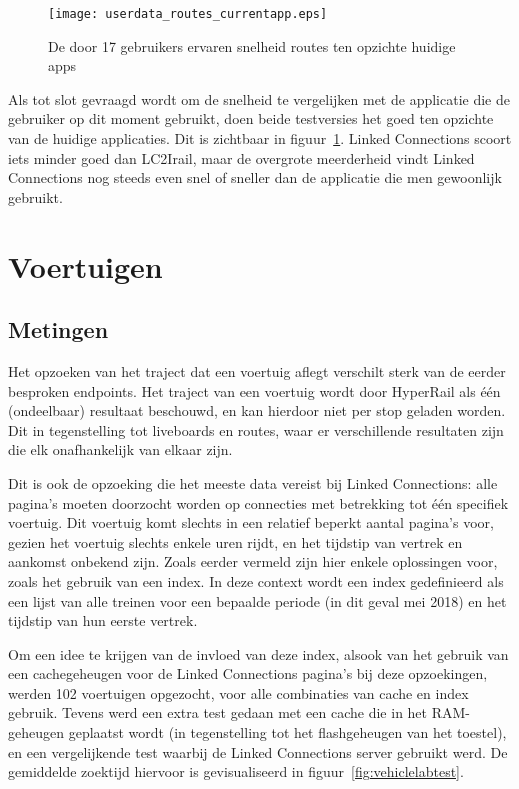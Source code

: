 \begin{figure}[ht]
	\centering
	\texttt{[image: userdata\_routes\_currentapp.eps]}
	\caption[Door gebruikers ervaren snelheid routes tov huidige apps]{De door 17 gebruikers ervaren snelheid routes ten opzichte huidige apps }
	\label{fig:relativePerceptionRoutes}
\end{figure}

Als tot slot gevraagd wordt om de snelheid te vergelijken met de applicatie die de gebruiker op dit moment gebruikt, doen beide testversies het goed ten opzichte van de huidige applicaties. Dit is zichtbaar in figuur~\ref{fig:relativePerceptionRoutes}. Linked Connections scoort iets minder goed dan LC2Irail, maar de overgrote meerderheid vindt Linked Connections nog steeds even snel of sneller dan de applicatie die men gewoonlijk gebruikt.


\section{Voertuigen}

\subsection{Metingen}
Het opzoeken van het traject dat een voertuig aflegt verschilt sterk van de eerder besproken endpoints. Het traject van een voertuig wordt door HyperRail als één (ondeelbaar) resultaat beschouwd, en kan hierdoor niet per stop geladen worden. Dit in tegenstelling tot liveboards en routes, waar er verschillende resultaten zijn die elk onafhankelijk van elkaar zijn.

Dit is ook de opzoeking die het meeste data vereist bij Linked Connections: alle pagina's moeten doorzocht worden op connecties met betrekking tot één specifiek voertuig. Dit voertuig komt slechts in een relatief beperkt aantal pagina's voor, gezien het voertuig slechts enkele uren rijdt, en het tijdstip van vertrek en aankomst onbekend zijn. Zoals eerder vermeld %
zijn hier enkele oplossingen voor, zoals het gebruik van een index. In deze context wordt een index gedefinieerd als een lijst van alle treinen voor een bepaalde periode (in dit geval mei 2018) en het tijdstip van hun eerste vertrek.

Om een idee te krijgen van de invloed van deze index, alsook van het gebruik van een cachegeheugen voor de Linked Connections pagina's bij deze opzoekingen, werden 102 voertuigen opgezocht, voor alle combinaties van cache en index gebruik. Tevens werd een extra test gedaan met een cache die in het RAM-geheugen geplaatst wordt (in tegenstelling tot het flashgeheugen van het toestel), en een vergelijkende test waarbij de Linked Connections server gebruikt werd. De gemiddelde zoektijd hiervoor is gevisualiseerd in figuur~\ref{fig:vehiclelabtest}.

